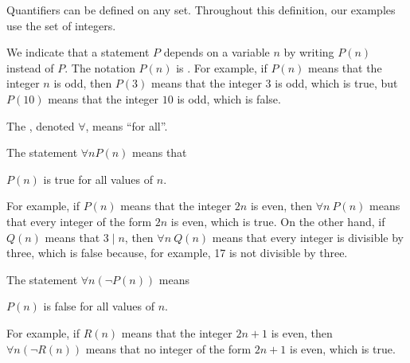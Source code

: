 \begin{defn}[Quantifiers]
\label{defn_quantifiers}
    Quantifiers can be defined on any set.  Throughout this definition, our examples use the set of integers.
    \begin{apart}
        \item We indicate that a statement $P$ depends on a variable $n$ by writing $P(n)$ instead of $P$.  The notation $P(n)$ is .  For example, if $P(n)$ means that the integer $n$ is odd, then $P(3)$ means that the integer $3$ is odd, which is true, but $P(10)$ means that the integer $10$ is odd, which is false. 

        \item The , denoted $\forall$, means ``for all''. 
            \begin{bull}             
                \item The statement $\forall n P(n)$ means that
                    \begin{center}
                        $P(n)$ is true for all values of $n$.
                    \end{center} 
                For example, if $P(n)$ means that the integer $2n$ is even, then $\forall n ~ P(n)$ means that every integer of the form $2n$ is even,
                which is true.  On the other hand, if $Q(n)$ means that $3 \mid n$, then $\forall n ~ Q(n)$ means that every integer is divisible by three, which is false because, for example, 17 is not divisible by three.
                \item The statement $\forall n(\neg P(n))$ means
                    \begin{center}
                        $P(n)$ is false for all values of $n$.           
                    \end{center}
                For example, if $R(n)$ means that the integer $2n+1$ is even, then $\forall n (\neg R(n))$ means that no integer of the form $2n+1$ is even, which is true.
            \end{bull}
        

\end{apart}
\end{defn}

